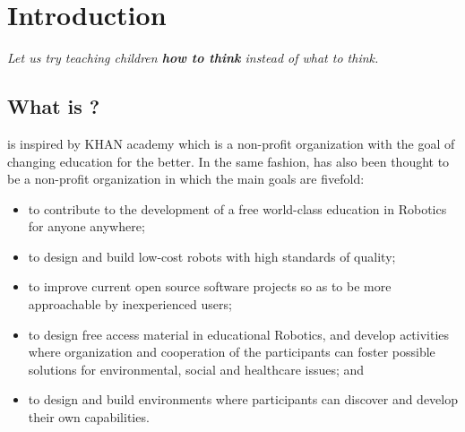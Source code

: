 
\chapter{Introduction}  %

\graphicspath{{Chapter1/Figs/}{Chapter1/Figs/}}

\vspace{1mm}
\footnotesize {
\begin{flushright}
\textit{
Let us try teaching children \textbf{how to think} instead of what to think.
}\\
\end{flushright}
}
\vspace{1mm}


\section{What is {\librER}?}
{\librER} is inspired by KHAN academy \cite{KHAN} which is a non-profit organization
with the goal of changing education for the better. In the same fashion, {\librER} 
has also been thought to be a non-profit organization in which the main goals are 
fivefold:
\begin{itemize}[noitemsep,topsep=0pt,parsep=0pt,partopsep=0pt]
 \item to contribute to the development of a free world-class education in Robotics 
 for anyone anywhere;
 \item to design and build low-cost robots with high standards of quality;
 \item to improve current open source software projects so as to be more approachable 
 by inexperienced users; 
 \item to design free access material in educational Robotics, and develop activities 
 where organization and cooperation of the participants can foster
 possible solutions for environmental, social and healthcare issues; and
 \item to design and build environments where participants can discover and
 develop their own capabilities.
\end{itemize}

